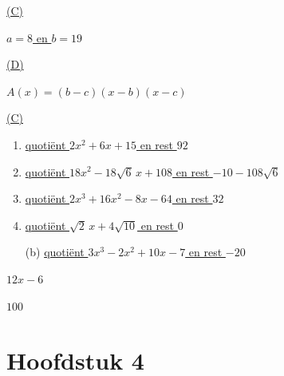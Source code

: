 \documentclass{ximera}
\begin{document}
\begin{Antwoord} \label{antw3.9}
\hyperlink{oef3.9}{(C)}
\end{Antwoord}

\begin{Antwoord} \label{antw3.10}
\hyperlink{oef3.10}{$a = 8$ en $b = 19$}
\end{Antwoord}

\begin{Antwoord} \label{antw3.11}
\hyperlink{oef3.11}{(D)}
\end{Antwoord}

\begin{Antwoord} \label{antw3.12}
\hyperlink{oef3.12}{$A(x) = (b-c)(x-b)(x-c)$}
\end{Antwoord}

\begin{Antwoord} \label{antw3.13}
\hyperlink{oef3.13}{(C)}
\end{Antwoord}

\begin{Antwoord} \label{antw3.14}
\begin{enumerate}
\item
\hyperlink{oef3.14}{quoti\"ent $2x^2+6x+15$ en rest $92$}
\item
\hyperlink{oef3.14}{quoti\"ent $18x^2 - 18\sqrt{6}\,x+108$ en rest $-10-108\sqrt{6}$}
\item
\hyperlink{oef3.14}{quoti\"ent $2x^3+16x^2-8x-64$ en rest $32$}
\item
\hyperlink{oef3.14}{quoti\"ent $\sqrt{2}\,x+4\sqrt{10}$ en rest $0$}
\end{enumerate}
\end{Antwoord}

\begin{Antwoord} \label{antw3.15}
\begin{enumerate}
\item[(b)]
\hyperlink{oef3.15}{quoti\"ent $3x^3-2x^2+10x-7$ en rest $-20$}
\end{enumerate}
\end{Antwoord}

\begin{Antwoord} \label{antw3.16}
\hyperlink{oef3.16}{$12x-6$}
\setcounter{enumi}{19}
\end{Antwoord}

\begin{Antwoord} \label{antw3.20}
\hyperlink{oef3.20}{$100$}
\setcounter{enumi}{0}
\end{Antwoord}

\section*{Hoofdstuk 4}
\end{document}
